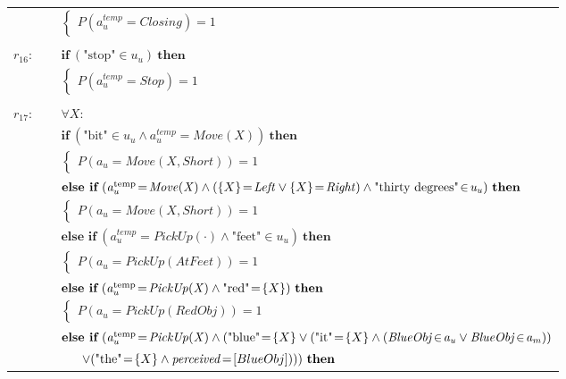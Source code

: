 \begin{footnotesize}
\begin{longtable}{p{1cm}l}
 & \;\;\;\;\; $ \begin{cases}P(\mathit{a_u^{\text{temp}}}\!=\!\mathit{Closing})\!=\!1 \end{cases}$ \\ \\[-1mm]
$r_{16}$: \ \ & $ \textbf{if} \ (\text{"stop"}\!\in\!\mathit{u_u}) \ \textbf{then} $ \\
 & \;\;\;\;\; $ \begin{cases}P(\mathit{a_u^{\text{temp}}}\!=\!\mathit{Stop})\!=\!1 \end{cases}$ \\ \\[-1mm]
$r_{17}$: \ \ & $\forall X: $ \\ & $ \textbf{if} \ (\text{"bit"}\!\in\!\mathit{u_u} \land \mathit{a_u^{\text{temp}}}\!=\!\mathit{Move({X})}) \ \textbf{then} $ \\
 & \;\;\;\;\; $ \begin{cases}P(\mathit{a_u}\!=\!\mathit{Move({X},Short)})\!=\!1 \end{cases}$ \vspace{1mm} \\ & $ \textbf{else if} \ (\mathit{a_u^{\text{temp}}}\!=\!\mathit{Move({X})} \land (\mathit\{X\}\!=\!\mathit{Left} \lor \mathit\{X\}\!=\!\mathit{Right}) \land \text{"thirty degrees"}\!\in\!\mathit{u_u}) \ \textbf{then}$ \\
& \;\;\;\;\; $ \begin{cases}P(\mathit{a_u}\!=\!\mathit{Move({X},Short)})\!=\!1 \end{cases}$ \vspace{1mm} \\ & $ \textbf{else if} \ (\mathit{a_u^{\text{temp}}}\!=\!\mathit{PickUp(\cdot)} \land \text{"feet"}\!\in\!\mathit{u_u}) \ \textbf{then}$ \\
& \;\;\;\;\; $ \begin{cases}P(\mathit{a_u}\!=\!\mathit{PickUp(AtFeet)})\!=\!1 \end{cases}$ \vspace{1mm} \\ & $ \textbf{else if} \ (\mathit{a_u^{\text{temp}}}\!=\!\mathit{PickUp({X})} \land \text{"red"}\!=\!\mathit\{X\}) \ \textbf{then}$ \\
& \;\;\;\;\; $ \begin{cases}P(\mathit{a_u}\!=\!\mathit{PickUp(RedObj)})\!=\!1 \end{cases}$ \vspace{1mm} \\ & $ \textbf{else if} \ (\mathit{a_u^{\text{temp}}}\!=\!\mathit{PickUp({X})} \land (\text{"blue"}\!=\!\mathit\{X\} \lor (\text{"it"}\!=\!\mathit\{X\} \land (\mathit{BlueObj}\!\in\!\mathit{a_u} \lor \mathit{BlueObj}\!\in\!\mathit{a_m})) $ \\ & $\ \ \ \ \ \lor (\text{"the"}\!=\!\mathit\{X\} \land \mathit{perceived}\!=\![BlueObj] ))) \ \textbf{then}$ \\

\end{longtable}
\end{footnotesize}
